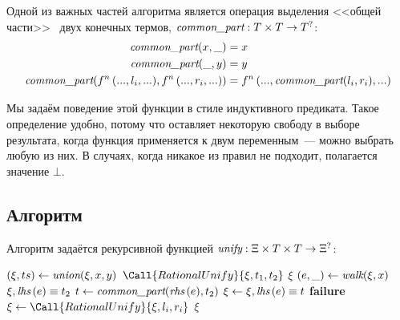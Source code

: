 Одной из важных частей алгоритма является операция выделения <<общей части>>~\cite{martelli1984efficient} двух конечных термов, $\textit{common\_part} : T \times T \rightarrow T^?$:
\begin{equation*}
    \begin{split}
        \textit{common\_part}(x, \_) &= x \\
        \textit{common\_part}(\_, y) &= y \\
        \textit{common\_part}(f^n\,(..., l_i, ...), f^n\,(..., r_i, ...)) &= f^n\,(..., \textit{common\_part}(l_i, r_i), ...) \\
    \end{split}
\end{equation*}

Мы задаём поведение этой функции в стиле индуктивного предиката. Такое определение удобно, потому что оставляет некоторую свободу в выборе результата, когда функция применяется к двум переменным~--- можно выбрать любую из них. В случаях, когда никакое из правил не подходит, полагается значение $\bot$.


\subsection{Алгоритм}

Алгоритм задаётся рекурсивной функцией $\textit{unify} : \Xi \times T \times T \rightarrow \Xi^?$:
\begin{algorithmic}[1]
            \State $(\xi, ts) \gets \textit{union}(\xi, x, y)$
                \State \Return $\Call{RationalUnify}{\xi, t_1, t_2}$
            \EndIf
            \State \Return $\xi$
        \EndIf
            \State $(e, \_) \gets \textit{walk} (\xi, x)$
                \State \Return $\xi, \textit{lhs}\,(e) \equiv t_2$
            \EndIf
            \State $t \gets \textit{common\_part}(\textit{rhs}\,(e), t_2)$
            \EndIf
            \State $\xi \gets \xi, \textit{lhs}\,(e) \equiv t$
            \State \Return {}
        \EndIf
            \State \Return {}
        \EndIf
                \State \bf failure
            \EndIf
                \State $\xi \gets \Call{RationalUnify}{\xi, l_i, r_i}$
            \EndFor
            \State \Return $\xi$
        \EndIf
    \EndFunction
\end{algorithmic}

